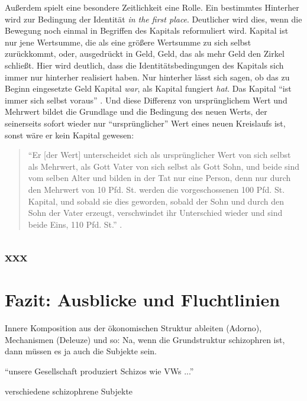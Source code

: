 \documentclass[12pt,
               DIV13,
               paper=a4,
               twoside=false,
               onehalfspacing,
               bibliography=totoc,
               toc=graduated,
               draft,
               ]{scrartcl}
\newcommand{\pc}[2]{\parencite[#1]{#2}}
\newcommand{\worries}[1]{\ifdraft{\textcolor{blue}{\texttt{(#1)}}}{}}
\begin{document}
Außerdem spielt eine besondere Zeitlichkeit eine Rolle. Ein bestimmtes
Hinterher wird zur Bedingung der Identität \emph{in the first place}.
Deutlicher wird dies, wenn die Bewegung noch einmal in Begriffen des
Kapitals reformuliert wird. Kapital ist nur jene Wertsumme, die als
eine größere Wertsumme zu sich selbst zurückkommt, oder, ausgedrückt
in Geld, Geld, das als mehr Geld den Zirkel schließt. \worries{Falte}
Hier wird deutlich, dass die Identitätsbedingungen des Kapitals sich
immer nur hinterher realisiert haben. Nur hinterher lässt sich sagen,
ob das zu Beginn eingesetzte Geld Kapital \emph{war}, als Kapital
fungiert \emph{hat}. Das Kapital "`ist immer sich selbst voraus"'
\pc{125}{strauss}. Und diese Differenz von ursprünglichem Wert und
Mehrwert bildet die Grundlage und die Bedingung des neuen Werts, der
seinerseits sofort wieder nur "`ursprünglicher"' Wert eines neuen
Kreislaufs ist, sonst wäre er kein Kapital gewesen:
%
\begin{spacing}{1}
\begin{quote}
"`Er [der Wert] unterscheidet sich als ursprünglicher
Wert von sich selbst als Mehrwert, als Gott Vater von sich selbst als
Gott Sohn, und beide sind vom selben Alter und bilden in der Tat nur
eine Person, denn nur durch den Mehrwert von 10 Pfd. St. werden die
vorgeschossenen 100 Pfd. St. Kapital, und sobald sie dies geworden,
sobald der Sohn und durch den Sohn der Vater erzeugt, verschwindet ihr
Unterschied wieder und sind beide Eins, 110 Pfd. St."' \pc{S. 169
f.}{kap}.
\end{quote}
\end{spacing}


\subsection{xxx}


\section{Fazit: Ausblicke und Fluchtlinien}

Innere Komposition aus der ökonomischen Struktur ableiten (Adorno),
Mechanismen (Deleuze) und so: Na, wenn die Grundstruktur schizophren
ist, dann müssen es ja auch die Subjekte sein.

"`unsere Gesellschaft produziert Schizos wie VWs ..."'

verschiedene schizophrene Subjekte


\newpage
\printshorthands
\printbibliography
\end{document}

